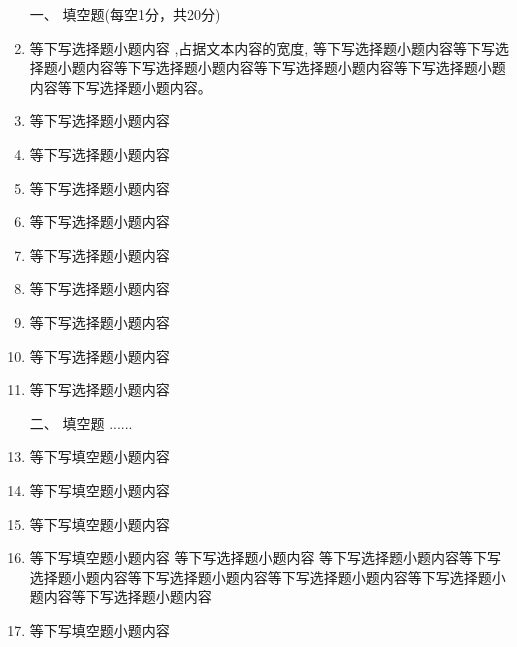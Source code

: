 \documentclass[12pt,twocolumn,landscape,UTF8,twoside]{ctexart}
\begin{document}
\begin{spacing}{1.3}
	\begin{enumerate} [1、]
		\item[\heiti 一、] {\heiti 填空题(每空1分，共20分)}
		\item 等下写选择题小题\tk[5]内容 \hphantom{文本内容},占据文本内容的宽度,\phantom{文本内容}	
		等下写选择题小题内容等下写选择题小题内容等下写选择题小题内容等下\tk 写选择题小题内容等下写选择题小题内容等下写选择题小题内容。
		\item 等下写选择题小题内容 
		\item 等下写选择题小题内容 
		\item 等下写选择题小题内容 
		\item 等下写选择题小题内容 
		\item 等下写选择题小题内容 
		\item 等下写选择题小题内容 
		\item 等下写选择题小题内容 
		\item 等下写选择题小题内容 
		\item 等下写选择题小题内容 
		
		\item[\heiti 二、] { \heiti 填空题  ...... }
		\item 等下写填空题小题内容 \pd
		\item 等下写填空题小题内容 \pd
		\item 等下写填空题小题内容 \pd
		\item 等下写填空题小题内容 等下写选择题小题内容 等下写选择题小题内容等下写选择题小题内容等下写选择题小题内容等下写选择题小题内容等下写选择题小题内容等下写选择题小题内容\pd
		\item 等下写填空题小题内容 \pd
		

\end{enumerate}
\end{spacing}
\end{document}
